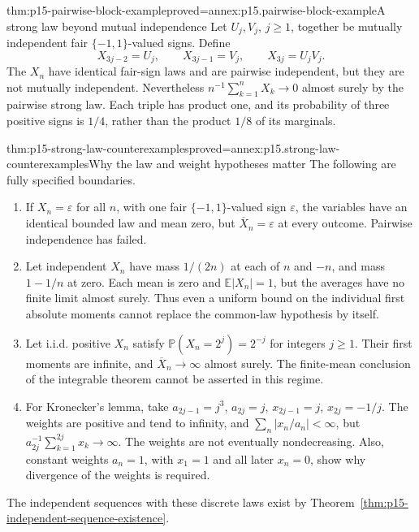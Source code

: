 \begin{hbtheorem}{thm:p15-pairwise-block-example}{proved=annex:p15.pairwise-block-example}{A strong law beyond mutual independence}
Let \(U_j,V_j\), \(j\geq1\), together be mutually independent
fair \(\{-1,1\}\)-valued signs. Define
\[
 X_{3j-2}=U_j,\qquad X_{3j-1}=V_j,\qquad X_{3j}=U_jV_j.
\]
The \(X_n\) have identical fair-sign laws and are pairwise independent,
but they are not mutually independent. Nevertheless
\(n^{-1}\sum_{k=1}^nX_k\to0\) almost surely by the pairwise strong
law. Each triple has product one, and its probability of three positive
signs is \(1/4\), rather than the product \(1/8\) of its marginals.
\end{hbtheorem}

\begin{hbtheorem}{thm:p15-strong-law-counterexamples}{proved=annex:p15.strong-law-counterexamples}{Why the law and weight hypotheses matter}
The following are fully specified boundaries.
\begin{enumerate}
\item If \(X_n=\varepsilon\) for all \(n\), with one fair
\(\{-1,1\}\)-valued sign \(\varepsilon\), the variables have an
identical bounded law and mean zero, but
\(\overline X_n=\varepsilon\) at every outcome. Pairwise independence
has failed.
\item Let independent \(X_n\) have mass \(1/(2n)\) at each of
\(n\) and \(-n\), and mass \(1-1/n\) at zero. Each mean is zero
and \(\mathbb E|X_n|=1\), but the averages have no finite limit
almost surely. Thus even a uniform bound on the individual first
absolute moments cannot replace the common-law hypothesis by itself.
\item Let i.i.d. positive \(X_n\) satisfy
\(\mathbb P(X_n=2^j)=2^{-j}\) for integers \(j\geq1\).
Their first moments are infinite, and
\(\overline X_n\to\infty\) almost surely. The finite-mean conclusion
of the integrable theorem cannot be asserted in this regime.
\item For Kronecker's lemma, take
\(a_{2j-1}=j^3\), \(a_{2j}=j\), \(x_{2j-1}=j\),
\(x_{2j}=-1/j\). The weights are positive and tend to infinity,
and \(\sum_n|x_n/a_n|<\infty\), but
\(a_{2j}^{-1}\sum_{k=1}^{2j}x_k\to\infty\).
The weights are not eventually nondecreasing.
Also, constant weights \(a_n=1\), with \(x_1=1\) and all later
\(x_n=0\), show why divergence of the weights is required.
\end{enumerate}
The independent sequences with these discrete laws exist by
Theorem~\ref{thm:p15-independent-sequence-existence}.
\end{hbtheorem}

